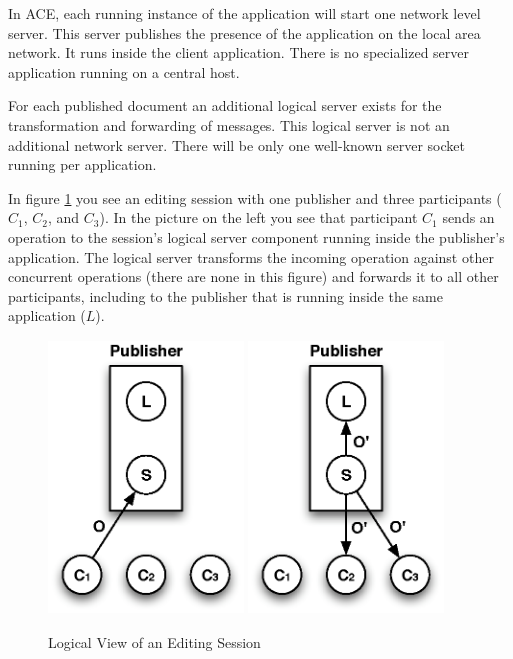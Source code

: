 \documentclass[11pt,a4paper]{article}
\begin{document}
In ACE, each running instance of the application will start one network level
server. This server publishes the presence of the application on the local
area network. It runs inside the client application. There is no specialized 
server application running on a central host.

For each published document an additional logical server exists for the 
transformation and forwarding of messages. This logical server is not an 
additional network server. There will be only one well-known server
socket running per application.

In figure \ref{fig:session} you see an editing session with one publisher 
and three participants ($C_{1}$, $C_{2}$, and $C_{3}$). In the picture on
the left you see that participant $C_{1}$ sends an operation to the
session's logical server component running inside the publisher's application.
The logical server transforms the incoming operation against other concurrent
operations (there are none in this figure) and forwards it to all other
participants, including to the publisher that is running inside the same
application ($L$).

\begin{figure}[H]
 \centering
 \includegraphics[width=5.18cm,height=7.26cm]{../images/session-1.eps}
 \includegraphics[width=5.18cm,height=7.26cm]{../images/session-2.eps}
 \caption{Logical View of an Editing Session}
 \label{fig:session}
\end{figure}
\end{document}
